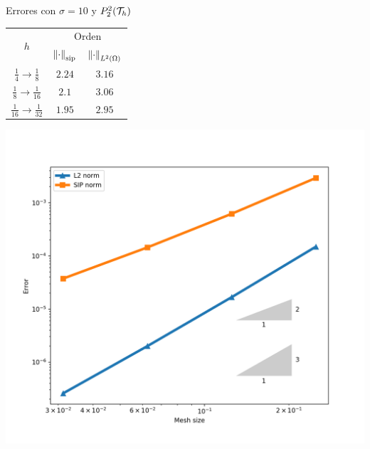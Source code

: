 		
		\begin{frame}{Errores con $\sigma=10$ y $\relax{P}^2_2(\mathcal{T}_h)$}
		\begin{minipage}{0.49\textwidth}
			\centering
			\begin{tabular}{|c|c|c|}
				\hline 
				\multirow{2}{*}{$h$} & \multicolumn{2}{c|}{Orden} \\
				\cline{2-3}
				&  $\left\|\cdot\right\|_{\text{sip}}$ & $\left\|\cdot\right\|_{L^2(\Omega)}$ \\ 
				\hline
				\hline
				$\frac{1}{4}\to\frac{1}{8}$ & $2.24$ & $3.16$ \\ 
				\hline 
				$\frac{1}{8}\to\frac{1}{16}$ & $2.1$ & $3.06$ \\ 
				\hline 
				$\frac{1}{16}\to\frac{1}{32}$ & $1.95$ & $2.95$\\
				\hline
			\end{tabular}
		\end{minipage}
		\begin{minipage}{0.5\textwidth}
			\centering
			\includegraphics[scale=0.30]{img/Difusion/errores_difusion_P2dc.png}
		\end{minipage}
		\end{frame}
		
